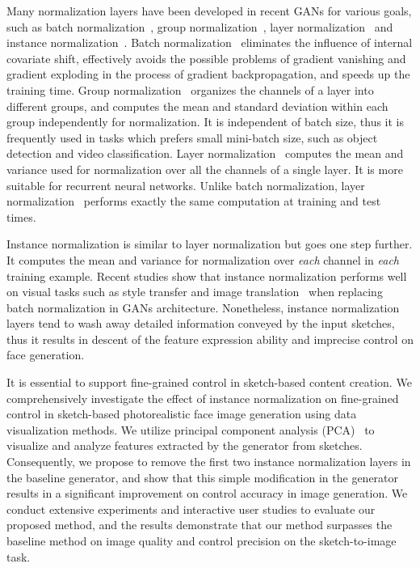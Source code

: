 \documentclass[10pt,twocolumn,letterpaper]{article}
\begin{document}
Many normalization layers have been developed in recent GANs for various goals, such as batch normalization~\cite{bn}, group normalization~\cite{gn}, layer normalization~\cite{ln} and instance normalization~\cite{instance_norm}. 
Batch normalization~\cite{bn} eliminates the influence of internal covariate shift, effectively avoids the possible problems of gradient vanishing and gradient exploding in the process of gradient backpropagation, and speeds up the training time. 
Group normalization~\cite{gn} organizes the channels of a layer into different groups, and computes the mean and standard deviation within each group independently for normalization. It is independent of batch size, thus it is frequently used in tasks which prefers small mini-batch size, such as object detection and video classification.
Layer normalization~\cite{ln} computes the mean and variance used for normalization over all the channels of a single layer. It is more suitable for recurrent neural networks. Unlike batch normalization, layer normalization~\cite{instance_norm} performs exactly the same computation at training and test times.

Instance normalization is similar to layer normalization but goes one step further. It computes the mean and variance for normalization over \emph{each} channel in \emph{each} training example.
Recent studies show that instance normalization performs well on visual tasks such as style transfer and image translation~\cite{pix2pixhd,spade,cyclegan} when replacing batch normalization in GANs architecture. 
Nonetheless, instance normalization layers tend to wash away detailed information conveyed by the input sketches, thus it results in descent of the feature expression ability and imprecise control on face generation. 

It is essential to support fine-grained control in sketch-based content creation. 
We comprehensively investigate the effect of instance normalization on fine-grained control in sketch-based photorealistic face image generation using data visualization methods. 
We utilize principal component analysis (PCA)~\cite{pca} to visualize and analyze features extracted by the generator from sketches. 
Consequently, we propose to remove the first two instance normalization layers in the baseline generator, and show that this simple modification in the generator results in a significant improvement on control accuracy in image generation. 
We conduct extensive experiments and interactive user studies to evaluate our proposed method, and the results demonstrate that our method surpasses the baseline method on image quality and control precision on the sketch-to-image task.
\end{document}
